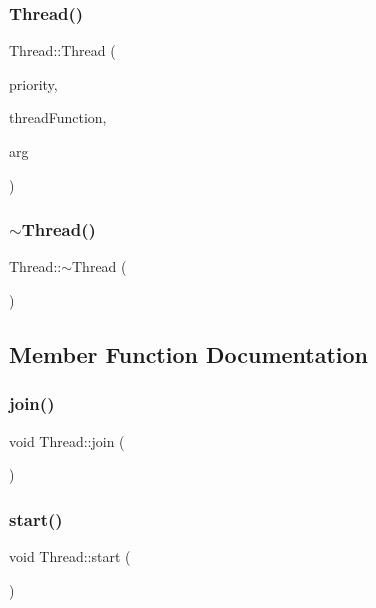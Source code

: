 \subsubsection{\texorpdfstring{Thread()}{Thread()}}
{\footnotesize\ttfamily Thread\+::\+Thread (\begin{DoxyParamCaption}\item[{\hyperlink{class_thread_a42f854dd02a3640e422b2f3288067744}{Priority\+Level}}]{priority,  }\item[{Thread\+Function\+Type $\ast$}]{thread\+Function,  }\item[{void $\ast$}]{arg }\end{DoxyParamCaption})\hspace{0.3cm}{\ttfamily [inline]}}

\mbox{\label{class_thread_a37d9edd3a1a776cbc27dedff949c9726}} 
\subsubsection{\texorpdfstring{$\sim$\+Thread()}{~Thread()}}
{\footnotesize\ttfamily Thread\+::$\sim$\+Thread (\begin{DoxyParamCaption}{ }\end{DoxyParamCaption})}



\subsection{Member Function Documentation}
\mbox{\label{class_thread_a4d9d788e98388a3217831a9046709deb}} 
\subsubsection{\texorpdfstring{join()}{join()}}
{\footnotesize\ttfamily void Thread\+::join (\begin{DoxyParamCaption}{ }\end{DoxyParamCaption})}

\mbox{\label{class_thread_a1f53ee62bd30a7924186ef26150ce262}} 
\subsubsection{\texorpdfstring{start()}{start()}}
{\footnotesize\ttfamily void Thread\+::start (\begin{DoxyParamCaption}{ }\end{DoxyParamCaption})}



